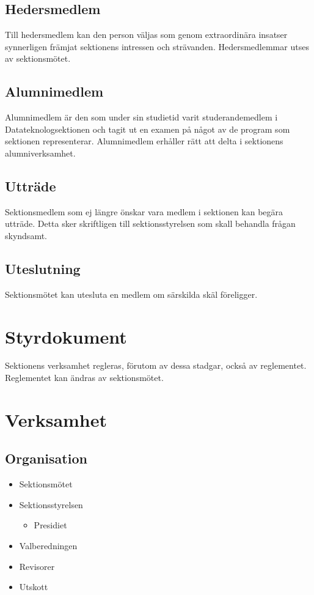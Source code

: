 \documentclass{datateknologsektionen-document}
\begin{document}
\subsection{Hedersmedlem}
Till hedersmedlem kan den person väljas som genom extraordinära insatser synnerligen
främjat sektionens intressen och strävanden. Hedersmedlemmar utses av sektionsmötet.

\subsection{Alumnimedlem}
Alumnimedlem är den som under sin studietid varit studerandemedlem i
Datateknologsektionen och tagit ut en examen på något av de program som sektionen
representerar. Alumnimedlem erhåller rätt att delta i sektionens alumniverksamhet.

\subsection{Utträde}
Sektionsmedlem som ej längre önskar vara medlem i sektionen kan begära utträde.
Detta sker skriftligen till sektionsstyrelsen som skall behandla frågan skyndsamt.

\subsection{Uteslutning}
Sektionsmötet kan utesluta en medlem om särskilda skäl föreligger.

\section{Styrdokument}
Sektionens verksamhet regleras, förutom av dessa stadgar, också av reglementet.
Reglementet kan ändras av sektionsmötet.

\section{Verksamhet}
\subsection{Organisation}
\begin{itemize}
  \item Sektionsmötet
  \item Sektionsstyrelsen
        \begin{itemize}
          \item Presidiet
        \end{itemize}
  \item Valberedningen
  \item Revisorer
  \item Utskott
\end{itemize}
\end{document}
